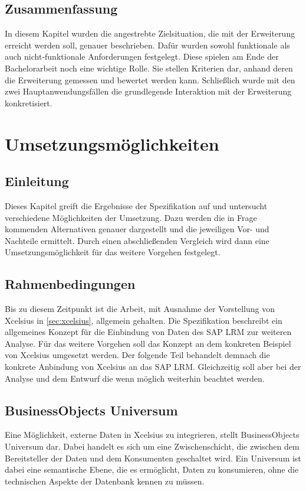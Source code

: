 \begin{onehalfspacing}
{}

\section{Zusammenfassung}
In diesem Kapitel wurden die angestrebte Zielsituation, die mit der Erweiterung erreicht werden soll, genauer beschrieben. Dafür wurden sowohl funktionale als auch nicht-funktionale Anforderungen festgelegt. Diese spielen am Ende der Bachelorarbeit noch eine wichtige Rolle. Sie stellen Kriterien dar, anhand deren die Erweiterung gemessen und bewertet werden kann. Schließlich wurde mit den zwei Hauptanwendungsfällen die grundlegende Interaktion mit der Erweiterung konkretisiert.

\chapter{Umsetzungsmöglichkeiten}

\section{Einleitung}
Dieses Kapitel greift die Ergebnisse der Spezifikation auf und untersucht verschiedene Möglichkeiten der Umsetzung. Dazu werden die in Frage kommenden Alternativen genauer dargestellt und die jeweiligen Vor- und Nachteile ermittelt. Durch einen abschließenden Vergleich wird dann eine Umsetzungsmöglichkeit für das weitere Vorgehen festgelegt.

\section{Rahmenbedingungen}
Bis zu diesem Zeitpunkt ist die Arbeit, mit Ausnahme der Vorstellung von \gls{Xcelsius} in \vref{sec:xcelsius}, allgemein gehalten. Die Spezifikation beschreibt ein allgemeines Konzept für die Einbindung von Daten des SAP LRM zur weiteren Analyse. Für das weitere Vorgehen soll das Konzept an dem konkreten Beispiel von \gls{Xcelsius} umgesetzt werden. Der folgende Teil behandelt demnach die konkrete Anbindung von \gls{Xcelsius} an das SAP LRM. Gleichzeitig soll aber bei der Analyse und dem Entwurf die  wenn möglich weiterhin beachtet werden.

\section{BusinessObjects Universum}
Eine Möglichkeit, externe Daten in \gls{Xcelsius} zu integrieren, stellt BusinessObjects Universum dar. Dabei handelt es sich um eine Zwischenschicht, die zwischen dem Bereitsteller der Daten und dem Konsumenten geschaltet wird. Ein Universum ist dabei eine semantische Ebene, die es ermöglicht, Daten zu konsumieren, ohne die technischen Aspekte der Datenbank kennen zu müssen.



\end{onehalfspacing}
